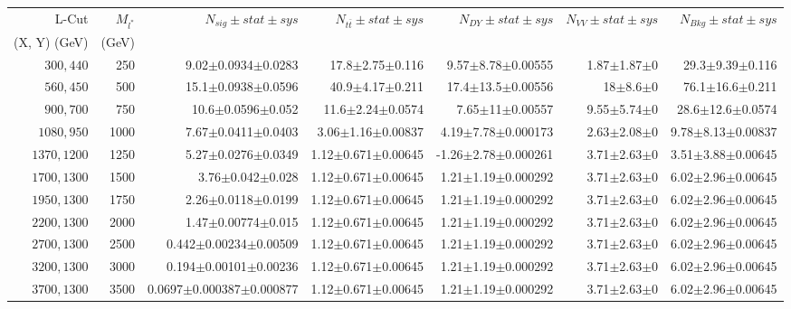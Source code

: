 \documentclass[]{article}
\begin{document}
\begin{table}
\begin{center}
\scriptsize{
\begin{tabular}{ |r|r|r|r|r|r|r|}
\hline 
L-Cut & $M_{l^*}$ & $N_{sig}\pm stat \pm sys $ &$N_{t\bar{t}}\pm stat \pm sys $ & $N_{DY}\pm stat \pm sys $ & $N_{VV}\pm stat \pm sys $ &$N_{Bkg}\pm stat \pm sys$\\
 (X, Y) (GeV) & (GeV) & && &&\\
\hline 
$300, 440$ & 250 & 9.02$\pm$0.0934$\pm$0.0283 & 17.8$\pm$2.75$\pm$0.116 & 9.57$\pm$8.78$\pm$0.00555 & 1.87$\pm$1.87$\pm$0 & 29.3$\pm$9.39$\pm$0.116 \\
$560, 450$ & 500 & 15.1$\pm$0.0938$\pm$0.0596 & 40.9$\pm$4.17$\pm$0.211 & 17.4$\pm$13.5$\pm$0.00556 & 18$\pm$8.6$\pm$0 & 76.1$\pm$16.6$\pm$0.211 \\
$900, 700$ & 750 & 10.6$\pm$0.0596$\pm$0.052 & 11.6$\pm$2.24$\pm$0.0574 & 7.65$\pm$11$\pm$0.00557 & 9.55$\pm$5.74$\pm$0 & 28.6$\pm$12.6$\pm$0.0574 \\
$1080,950$ & 1000 & 7.67$\pm$0.0411$\pm$0.0403 & 3.06$\pm$1.16$\pm$0.00837 & 4.19$\pm$7.78$\pm$0.000173 & 2.63$\pm$2.08$\pm$0 & 9.78$\pm$8.13$\pm$0.00837 \\
$1370,1200$ & 1250 & 5.27$\pm$0.0276$\pm$0.0349 & 1.12$\pm$0.671$\pm$0.00645 & -1.26$\pm$2.78$\pm$0.000261 & 3.71$\pm$2.63$\pm$0 & 3.51$\pm$3.88$\pm$0.00645 \\
$1700,1300$ & 1500 & 3.76$\pm$0.042$\pm$0.028 & 1.12$\pm$0.671$\pm$0.00645 & 1.21$\pm$1.19$\pm$0.000292 & 3.71$\pm$2.63$\pm$0 & 6.02$\pm$2.96$\pm$0.00645 \\
$1950,1300$ & 1750 & 2.26$\pm$0.0118$\pm$0.0199 & 1.12$\pm$0.671$\pm$0.00645 & 1.21$\pm$1.19$\pm$0.000292 & 3.71$\pm$2.63$\pm$0 & 6.02$\pm$2.96$\pm$0.00645 \\
$2200,1300$ & 2000 & 1.47$\pm$0.00774$\pm$0.015 & 1.12$\pm$0.671$\pm$0.00645 & 1.21$\pm$1.19$\pm$0.000292 & 3.71$\pm$2.63$\pm$0 & 6.02$\pm$2.96$\pm$0.00645 \\
$2700,1300$ & 2500 & 0.442$\pm$0.00234$\pm$0.00509 & 1.12$\pm$0.671$\pm$0.00645 & 1.21$\pm$1.19$\pm$0.000292 & 3.71$\pm$2.63$\pm$0 & 6.02$\pm$2.96$\pm$0.00645 \\
$3200,1300$ & 3000 & 0.194$\pm$0.00101$\pm$0.00236 & 1.12$\pm$0.671$\pm$0.00645 & 1.21$\pm$1.19$\pm$0.000292 & 3.71$\pm$2.63$\pm$0 & 6.02$\pm$2.96$\pm$0.00645 \\
$3700,1300$ & 3500 & 0.0697$\pm$0.000387$\pm$0.000877 & 1.12$\pm$0.671$\pm$0.00645 & 1.21$\pm$1.19$\pm$0.000292 & 3.71$\pm$2.63$\pm$0 & 6.02$\pm$2.96$\pm$0.00645 \\

\end{tabular}}
\end{center}
\end{table}
\end{document}
